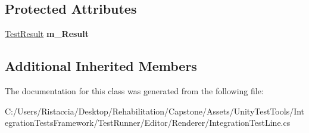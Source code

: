 \subsection*{Protected Attributes}
\begin{DoxyCompactItemize}
\item 
\mbox{\label{class_unity_test_1_1_integration_test_line_a2f9b497f29d1cd9456e6626795362b3e}} 
\hyperlink{class_unity_test_1_1_test_result}{Test\+Result} {\bfseries m\+\_\+\+Result}
\end{DoxyCompactItemize}
\subsection*{Additional Inherited Members}


The documentation for this class was generated from the following file\+:\begin{DoxyCompactItemize}
\item 
C\+:/\+Users/\+Ristaccia/\+Desktop/\+Rehabilitation/\+Capstone/\+Assets/\+Unity\+Test\+Tools/\+Integration\+Tests\+Framework/\+Test\+Runner/\+Editor/\+Renderer/Integration\+Test\+Line.\+cs\end{DoxyCompactItemize}
